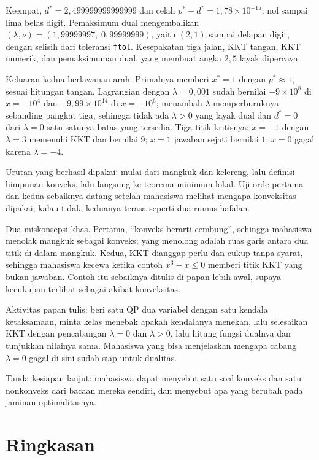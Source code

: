 Keempat, $d^{*}=2{,}499999999999999$ dan celah $p^{*}-d^{*}=1{,}78\times10^{-15}$:
nol sampai lima belas digit. Pemaksimum dual mengembalikan
$(\lambda,\nu)=(1{,}99999997,\;0{,}99999999)$, yaitu $(2,1)$ sampai delapan digit, dengan
selisih dari toleransi \texttt{ftol}. Kesepakatan tiga jalan, KKT tangan, KKT numerik, dan
pemaksimuman dual, yang membuat angka $2{,}5$ layak dipercaya.

Keluaran kedua berlawanan arah. Primalnya memberi $x^{*}=1$ dengan $p^{*}\approx1$,
sesuai hitungan tangan. Lagrangian dengan $\lambda=0{,}001$ sudah bernilai
$-9\times10^{8}$ di $x=-10^{4}$ dan $-9{,}99\times10^{14}$ di $x=-10^{6}$; menambah
$\lambda$ memperburuknya sebanding pangkat tiga, sehingga tidak ada $\lambda>0$ yang layak
dual dan $d^{*}=0$ dari $\lambda=0$ satu-satunya batas yang tersedia. Tiga titik
kritisnya: $x=-1$ dengan $\lambda=3$ memenuhi KKT dan bernilai $9$; $x=1$ jawaban sejati
bernilai $1$; $x=0$ gagal karena $\lambda=-4$.

\begin{untukdosen}
Urutan yang berhasil dipakai: mulai dari mangkuk dan kelereng, lalu definisi himpunan
konveks, lalu langsung ke teorema minimum lokal. Uji orde pertama dan kedua sebaiknya
datang setelah mahasiswa melihat mengapa konveksitas dipakai; kalau tidak, keduanya
terasa seperti dua rumus hafalan.

Dua miskonsepsi khas. Pertama, ``konveks berarti cembung'', sehingga mahasiswa menolak
mangkuk sebagai konveks; yang menolong adalah ruas garis antara dua titik di dalam
mangkuk. Kedua, KKT dianggap perlu-dan-cukup tanpa syarat, sehingga mahasiswa kecewa
ketika contoh $x^{3}-x\le0$ memberi titik KKT yang bukan jawaban. Contoh itu sebaiknya
ditulis di papan lebih awal, supaya kecukupan terlihat sebagai akibat konveksitas.

Aktivitas papan tulis: beri satu QP dua variabel dengan satu kendala ketaksamaan, minta
kelas menebak apakah kendalanya menekan, lalu selesaikan KKT dengan pencabangan
$\lambda=0$ dan $\lambda>0$, lalu hitung fungsi dualnya dan tunjukkan nilainya sama.
Mahasiswa yang bisa menjelaskan mengapa cabang $\lambda=0$ gagal di sini sudah siap untuk
dualitas.

Tanda kesiapan lanjut: mahasiswa dapat menyebut satu soal konveks dan satu nonkonveks
dari bacaan mereka sendiri, dan menyebut apa yang berubah pada jaminan optimalitasnya.
\end{untukdosen}

\section{Ringkasan}

